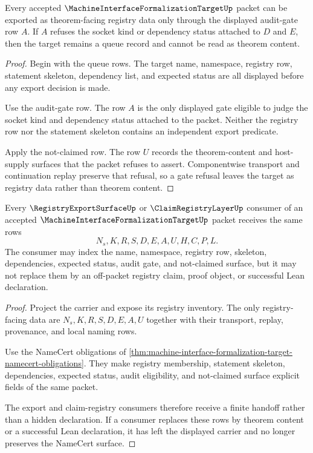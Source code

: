 \begin{theorem}
\label{thm:machine-interface-formalization-target-audit-gate-locality}
Every accepted $\MachineInterfaceFormalizationTargetUp$ packet can be exported as theorem-facing registry data only through the displayed audit-gate row $A$. If $A$ refuses the socket kind or dependency status attached to $D$ and $E$, then the target remains a queue record and cannot be read as theorem content.
\end{theorem}
\begin{proof}
Begin with the queue rows. The target name, namespace, registry row, statement skeleton, dependency list, and expected status are all displayed before any export decision is made.

Use the audit-gate row. The row $A$ is the only displayed gate eligible to judge the socket kind and dependency status attached to the packet. Neither the registry row nor the statement skeleton contains an independent export predicate.

Apply the not-claimed row. The row $U$ records the theorem-content and host-supply surfaces that the packet refuses to assert. Componentwise transport and continuation replay preserve that refusal, so a gate refusal leaves the target as registry data rather than theorem content.
\end{proof}

\begin{theorem}
\label{thm:machine-interface-formalization-target-registry-consistency-handoff}
Every $\RegistryExportSurfaceUp$ or $\ClaimRegistryLayerUp$ consumer of an accepted $\MachineInterfaceFormalizationTargetUp$ packet receives the same rows
$$
N_s,K,R,S,D,E,A,U,H,C,P,L .
$$
The consumer may index the name, namespace, registry row, skeleton, dependencies, expected status, audit gate, and not-claimed surface, but it may not replace them by an off-packet registry claim, proof object, or successful Lean declaration.
\end{theorem}
\begin{proof}
Project the carrier and expose its registry inventory. The only registry-facing data are $N_s,K,R,S,D,E,A,U$ together with their transport, replay, provenance, and local naming rows.

Use the NameCert obligations of \autoref{thm:machine-interface-formalization-target-namecert-obligations}. They make registry membership, statement skeleton, dependencies, expected status, audit eligibility, and not-claimed surface explicit fields of the same packet.

The export and claim-registry consumers therefore receive a finite handoff rather than a hidden declaration. If a consumer replaces these rows by theorem content or a successful Lean declaration, it has left the displayed carrier and no longer preserves the NameCert surface.
\end{proof}

